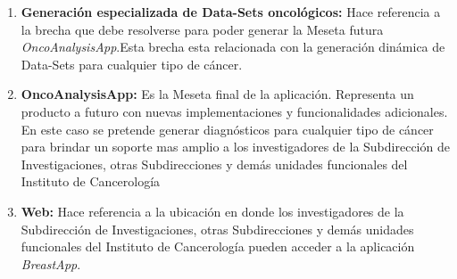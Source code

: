 \begin{enumerate}[label=\textbf{\arabic*})]
	\item  \textbf{Generación especializada de  Data-Sets oncológicos:} Hace referencia a la brecha que debe resolverse para poder generar la Meseta futura \textit{OncoAnalysisApp}.Esta brecha esta relacionada con la generación dinámica de Data-Sets para cualquier tipo de cáncer.
	
	\item  \textbf{OncoAnalysisApp:} Es la Meseta final de la aplicación. Representa un producto a futuro con nuevas implementaciones y funcionalidades adicionales. En este caso se pretende generar diagnósticos para cualquier tipo de cáncer para brindar un soporte mas amplio a los investigadores de la Subdirección de Investigaciones, otras Subdirecciones y demás unidades funcionales del Instituto  de Cancerología
	
	\item  \textbf{Web:} Hace referencia a la ubicación en donde los investigadores de la Subdirección de Investigaciones, otras Subdirecciones y demás unidades funcionales del Instituto de Cancerología pueden acceder a la aplicación \textit{BreastApp}.
\end{enumerate}


